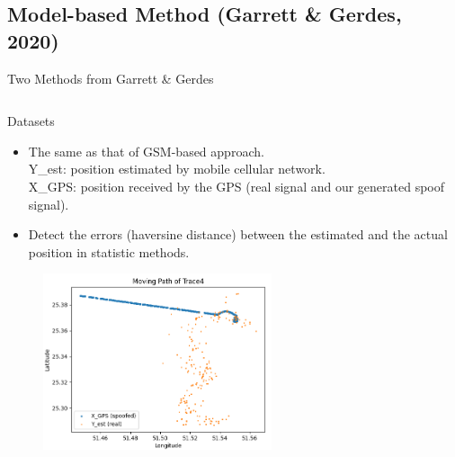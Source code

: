 \documentclass[aspectratio=169, 8pt]{beamer}
\begin{document}
\subsection{Model-based Method (Garrett \& Gerdes, 2020)}
\begin{frame}{Two Methods from Garrett \& Gerdes}


\begin{columns}[T]

    \begin{column}{0.6\linewidth}

        {\small
        \begin{block}{Datasets}
            \begin{itemize}
            \item The same as that of GSM-based approach.\\
                Y\_est: position estimated by mobile cellular network.\\
                X\_GPS: position received by the GPS (real signal and our generated spoof signal).\\
            \item Detect the errors (haversine distance) between the estimated and the actual position in statistic methods.
            \end{itemize}
        \end{block}
        }
        \begin{figure}
            \centering
            \includegraphics[width = 0.6\textwidth]{images/trace4.png}
            \label{fig:enter-label}
        \end{figure}
    \end{column}
    

\end{columns}
\end{frame}
\end{document}
